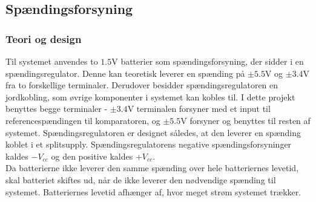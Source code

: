 \subsection{Spændingsforsyning} \label{Spaendingsforsying}
\subsubsection{Teori og design}
Til systemet anvendes to $1.5$V batterier som spændingsforsyning, der sidder i en spændingsregulator. Denne kan teoretisk leverer en spænding på $\pm5.5$V og $\pm3.4$V fra to forskellige terminaler. Derudover besidder spændingsregulatoren en jordkobling, som øvrige komponenter i systemet kan kobles til. I dette projekt benyttes begge terminaler - $\pm3.4$V terminalen forsyner med et input til referencespændingen til komparatoren, og $\pm5.5$V forsyner og benyttes til resten af systemet. Spændingsregulatoren er designet således, at den leverer en spænding koblet i et splitsupply. Spændingsregulatorens negative spændingsforsyninger kaldes $-V_{cc}$ og den positive kaldes $+V_{cc}$. \\%
Da batterierne ikke leverer den samme spænding over hele batteriernes levetid, skal batteriet skiftes ud, når de ikke leverer den nødvendige spænding til systemet. Batteriernes levetid afhænger af, hvor meget strøm systemet trækker. %

